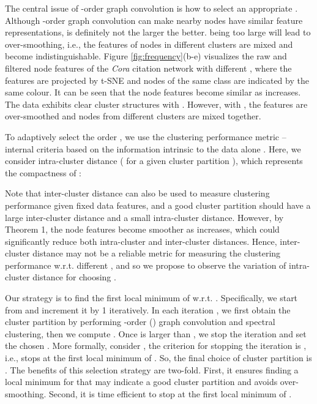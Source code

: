 \documentclass{article}
\begin{document}
The central issue of -order graph convolution is how to select an appropriate . Although -order graph convolution can make nearby nodes have similar feature representations,  is definitely not the larger the better.  being too large will lead to over-smoothing, i.e., the features of nodes in different clusters are mixed and become indistinguishable. Figure \ref{fig:frequency}(b-e) visualizes the raw and filtered node features of the \emph{Cora} citation network with different , where the features are projected by t-SNE \cite{van2008visualizing} and nodes of the same class are indicated by the same colour. It can be seen that the node features become similar as  increases. The data exhibits clear cluster structures with . However, with , the features are over-smoothed and nodes from different clusters are mixed together.

To adaptively select the order , we use the clustering performance metric -- internal criteria based on the information intrinsic to the data alone \cite{Aggarwal14}. Here, we consider intra-cluster distance ( for a given cluster partition ), which represents the compactness of :

Note that inter-cluster distance can also be used to measure clustering performance given fixed data features, and a good cluster partition should have a large inter-cluster distance and a small intra-cluster distance. However, by Theorem 1, the node features become smoother as  increases, which could significantly reduce both intra-cluster and inter-cluster distances. Hence, inter-cluster distance may not be a reliable metric for measuring the clustering performance w.r.t. different , and so we propose to observe the variation of intra-cluster distance for choosing .



Our strategy is to find the first local minimum of  w.r.t. . Specifically, we start from  and increment it by 1 iteratively. In each iteration , we first obtain the cluster partition  by performing -order () graph convolution and spectral clustering, then we compute . Once  is larger than , we stop the iteration and set the chosen . More formally, consider , the criterion for stopping the iteration is , i.e., stops at the first local minimum of . So, the final choice of cluster partition is . The benefits of this selection strategy are two-fold. First, it ensures finding a local minimum for  that may indicate a good cluster partition and avoids over-smoothing. Second, it is time efficient to stop at the first local minimum of .
\end{document}
